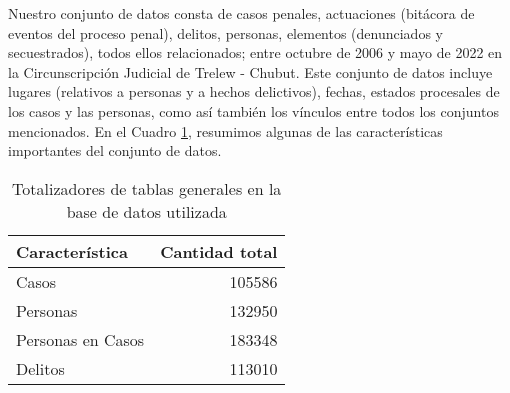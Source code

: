 Nuestro conjunto de datos consta de casos penales, actuaciones (bitácora de eventos del proceso penal), delitos, personas, elementos (denunciados y secuestrados), todos ellos relacionados; entre octubre de 2006 y mayo de 2022 en la Circunscripción Judicial de Trelew - Chubut. Este conjunto de datos incluye lugares (relativos a personas y a hechos delictivos), fechas, estados procesales de los casos y las personas, como así también los vínculos entre todos los conjuntos mencionados. En el Cuadro \ref{tab:TotalizadoresGenerales}, resumimos algunas de las características importantes del conjunto de datos.

\begin{table}
	\centering
	\caption{Totalizadores de tablas generales en la base de datos utilizada}
	\label{tab:TotalizadoresGenerales}
	\begin{tabular}{|l|r|}
		\hline
		\textbf{Característica} &  \textbf{Cantidad total} \\
		\hline
		Casos &  105586 \\
		\hline
		Personas &  132950 \\
		\hline
		Personas en Casos &  183348 \\
		\hline
		Delitos &  113010 \\
		\hline
	\end{tabular}
\end{table}
